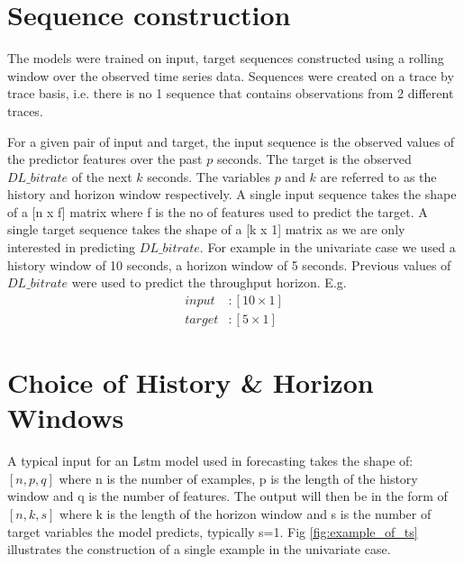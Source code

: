 \section{Sequence construction}
The models were trained on input, target sequences constructed using a rolling window over the observed time series data. Sequences were created on a trace by trace basis, i.e. there is no 1 sequence that contains observations from 2 different traces.

For a given pair of input and target, the input sequence is the observed values of the predictor features over the past $p$ seconds. The target is the observed $DL\_bitrate$ of the next $k$ seconds. The variables $p$ and $k$ are referred to as the history and horizon window respectively. A single input sequence takes the shape of a [n x f] matrix where f is the no of features used to predict the target. A single target sequence takes the shape of a [k x 1] matrix as we are only interested in predicting $DL\_bitrate$. For example in the univariate case we used a history window of 10 seconds, a horizon window of 5 seconds. Previous values of $DL\_bitrate$ were used to predict the throughput horizon. E.g.
\begin{equation}
\begin{aligned}
 input&: [10 \times 1] \\
 target&: [5 \times 1]
\end{aligned}
\end{equation}

\section{Choice of History \& Horizon Windows}
A typical input for an Lstm model used in forecasting takes the shape of: $[ n, p, q ]$ where n is the number of examples, p is the length of the history window and q is the number of features. The output will then be in the form of $[n, k, s ]$ where k is the length of the horizon window and s is the number of target variables the model predicts, typically s=1. Fig \ref{fig:example_of_ts} illustrates the construction of a single example in the univariate case.

